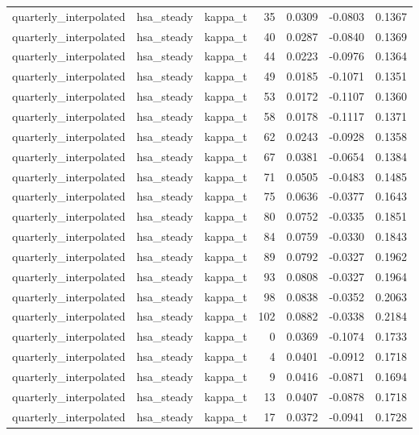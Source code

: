 \begin{tabular}{lllrrrr}
quarterly\_interpolated & hsa\_steady & kappa\_t & 35 & 0.0309 & -0.0803 & 0.1367 \\
quarterly\_interpolated & hsa\_steady & kappa\_t & 40 & 0.0287 & -0.0840 & 0.1369 \\
quarterly\_interpolated & hsa\_steady & kappa\_t & 44 & 0.0223 & -0.0976 & 0.1364 \\
quarterly\_interpolated & hsa\_steady & kappa\_t & 49 & 0.0185 & -0.1071 & 0.1351 \\
quarterly\_interpolated & hsa\_steady & kappa\_t & 53 & 0.0172 & -0.1107 & 0.1360 \\
quarterly\_interpolated & hsa\_steady & kappa\_t & 58 & 0.0178 & -0.1117 & 0.1371 \\
quarterly\_interpolated & hsa\_steady & kappa\_t & 62 & 0.0243 & -0.0928 & 0.1358 \\
quarterly\_interpolated & hsa\_steady & kappa\_t & 67 & 0.0381 & -0.0654 & 0.1384 \\
quarterly\_interpolated & hsa\_steady & kappa\_t & 71 & 0.0505 & -0.0483 & 0.1485 \\
quarterly\_interpolated & hsa\_steady & kappa\_t & 75 & 0.0636 & -0.0377 & 0.1643 \\
quarterly\_interpolated & hsa\_steady & kappa\_t & 80 & 0.0752 & -0.0335 & 0.1851 \\
quarterly\_interpolated & hsa\_steady & kappa\_t & 84 & 0.0759 & -0.0330 & 0.1843 \\
quarterly\_interpolated & hsa\_steady & kappa\_t & 89 & 0.0792 & -0.0327 & 0.1962 \\
quarterly\_interpolated & hsa\_steady & kappa\_t & 93 & 0.0808 & -0.0327 & 0.1964 \\
quarterly\_interpolated & hsa\_steady & kappa\_t & 98 & 0.0838 & -0.0352 & 0.2063 \\
quarterly\_interpolated & hsa\_steady & kappa\_t & 102 & 0.0882 & -0.0338 & 0.2184 \\
quarterly\_interpolated & hsa\_steady & kappa\_t & 0 & 0.0369 & -0.1074 & 0.1733 \\
quarterly\_interpolated & hsa\_steady & kappa\_t & 4 & 0.0401 & -0.0912 & 0.1718 \\
quarterly\_interpolated & hsa\_steady & kappa\_t & 9 & 0.0416 & -0.0871 & 0.1694 \\
quarterly\_interpolated & hsa\_steady & kappa\_t & 13 & 0.0407 & -0.0878 & 0.1718 \\
quarterly\_interpolated & hsa\_steady & kappa\_t & 17 & 0.0372 & -0.0941 & 0.1728 \\

\end{tabular}
